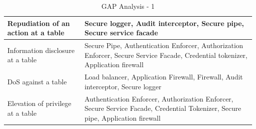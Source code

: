 \documentclass[a4paper,11pt]{report}
\begin{document}
\begin{table}[htpb]
\begin{center}
\begin{tabular}{| p{5cm} | p{} |}
Repudiation of an action at a table & Secure logger, Audit interceptor, Secure pipe, Secure service facade\\\hline
Information disclosure at a table & Secure Pipe, Authentication Enforcer, Authorization Enforcer, Secure Service Facade, Credential tokenizer, Application firewall \\\hline
DoS against a table & Load balancer, Application Firewall, Firewall, Audit interceptor, Secure logger\\\hline
Elevation of privilege at a table & Authentication Enforcer, Authorization Enforcer, Secure Service Facade, Credential Tokenizer, Secure pipe, Application firewall \\\hline
\end{tabular}
\end{center}
\caption{GAP Analysis - 1}
\label{table:gap1}
\end{table}
\end{document}
